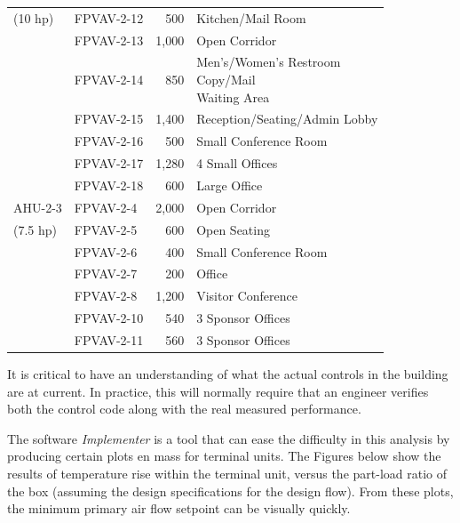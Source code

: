 \begin{table}[]
\begin{tabular}{@{}llrl@{}}
(10 hp)           & FPVAV-2-12 & 500   & Kitchen/Mail Room                        \\ \cmidrule(r){2-4}
                  & FPVAV-2-13 & 1,000 & Open Corridor                            \\ \cmidrule(r){2-4}
                  & FPVAV-2-14 & 850   & \pbox{\textwidth}{Men's/Women's Restroom \\ Copy/Mail         \\ Waiting Area } \\ \cmidrule(r){2-4}
                  & FPVAV-2-15 & 1,400 & Reception/Seating/Admin Lobby            \\ \cmidrule(r){2-4}
                  & FPVAV-2-16 & 500   & Small Conference Room                    \\ \cmidrule(r){2-4}
                  & FPVAV-2-17 & 1,280 & 4 Small Offices                          \\ \cmidrule(r){2-4}
                  & FPVAV-2-18 & 600   & Large Office                             \\ \midrule
AHU-2-3           & FPVAV-2-4  & 2,000 & Open Corridor                            \\ \cmidrule(r){2-4}
(7.5 hp)          & FPVAV-2-5  & 600   & Open Seating                             \\ \cmidrule(r){2-4}
                  & FPVAV-2-6  & 400   & Small Conference Room                    \\ \cmidrule(r){2-4}
                  & FPVAV-2-7  & 200   & Office                                   \\ \cmidrule(r){2-4}
                  & FPVAV-2-8  & 1,200 & Visitor Conference                       \\ \cmidrule(r){2-4}
                  & FPVAV-2-10 & 540   & 3 Sponsor Offices                        \\ \cmidrule(r){2-4}
                  & FPVAV-2-11 & 560   & 3 Sponsor Offices                        \\ \bottomrule
\end{tabular}
\end{table}

It is critical to have an understanding of what the actual controls in the building are at current. In practice, this will normally require that an engineer verifies both the control code along with the real measured performance.

The software \textit{Implementer} is a tool that can ease the difficulty in this analysis by producing certain plots en mass for terminal units. The Figures below show the results of temperature rise within the terminal unit, versus the part-load ratio of the box (assuming the design specifications for the design flow). From these plots, the minimum primary air flow setpoint can be visually quickly.

